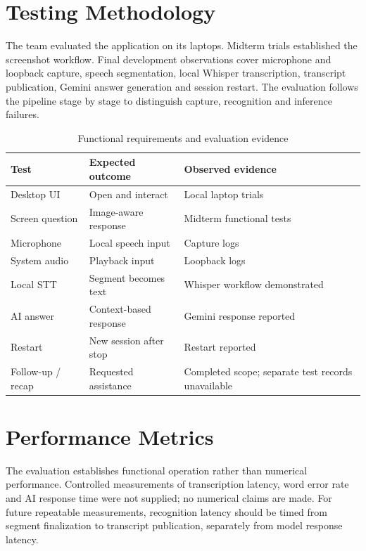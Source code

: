 \documentclass[openany]{tietreport}
\begin{document}
\section{Testing Methodology}
The team evaluated the application on its laptops. Midterm trials established the screenshot workflow. Final development observations cover microphone and loopback capture, speech segmentation, local Whisper transcription, transcript publication, Gemini answer generation and session restart. The evaluation follows the pipeline stage by stage to distinguish capture, recognition and inference failures.
\begin{table}[htbp]\centering\small\begin{tabularx}{\linewidth}{@{}lXX@{}}\toprule
Test & Expected outcome & Observed evidence \\ \midrule
Desktop UI & Open and interact & Local laptop trials \\
Screen question & Image-aware response & Midterm functional tests \\
Microphone & Local speech input & Capture logs \\
System audio & Playback input & Loopback logs \\
Local STT & Segment becomes text & Whisper workflow demonstrated \\
AI answer & Context-based response & Gemini response reported \\
Restart & New session after stop & Restart reported \\
Follow-up / recap & Requested assistance & Completed scope; separate test records unavailable \\
\bottomrule\end{tabularx}\caption{Functional requirements and evaluation evidence}\end{table}
\section{Performance Metrics}
The evaluation establishes functional operation rather than numerical performance. Controlled measurements of transcription latency, word error rate and AI response time were not supplied; no numerical claims are made. For future repeatable measurements, recognition latency should be timed from segment finalization to transcript publication, separately from model response latency.
\end{document}
